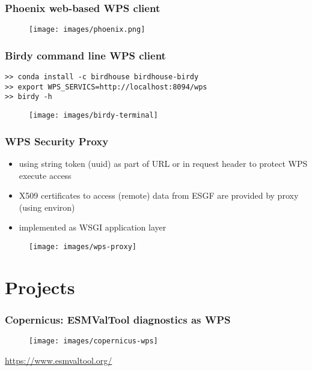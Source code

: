\documentclass{beamer}
\begin{document}
\begin{frame}
  \frametitle<presentation>{Phoenix web-based WPS client}
  \begin{figure}
    \texttt{[image: images/phoenix.png]}
  \end{figure}
\end{frame}

\begin{frame}[fragile]
  \frametitle<presentation>{Birdy command line WPS client}
  \begin{verbatim}
>> conda install -c birdhouse birdhouse-birdy
>> export WPS_SERVICS=http://localhost:8094/wps
>> birdy -h
  \end{verbatim}
  \begin{figure}
    \texttt{[image: images/birdy-terminal]}
  \end{figure}
\end{frame}

\begin{frame}
  \frametitle{WPS Security Proxy}
  \begin{itemize}
    \item using string token (uuid) as part of URL or in request header to protect WPS execute access
    \item X509 certificates to access (remote) data from ESGF are provided by proxy (using environ)
    \item implemented as WSGI application layer
  \end{itemize}
  \begin{figure}
    \texttt{[image: images/wps-proxy]}
  \end{figure}
\end{frame}

\section{Projects}

\begin{frame}
\frametitle<presentation>{Copernicus: ESMValTool diagnostics as WPS}

  \begin{figure}[ht]
    \centering
    \texttt{[image: images/copernicus-wps]}
  \end{figure}

  \centering
  \footnotesize{\url{https://www.esmvaltool.org/}}

\end{frame}
\end{document}
